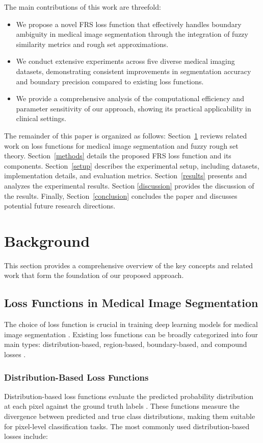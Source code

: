 \documentclass[review]{elsarticle}
\begin{document}
The main contributions of this work are threefold:
\begin{itemize}
    \item We propose a novel FRS loss function that effectively handles boundary ambiguity in medical image segmentation through the integration of fuzzy similarity metrics and rough set approximations.
    \item We conduct extensive experiments across five diverse medical imaging datasets, demonstrating consistent improvements in segmentation accuracy and boundary precision compared to existing loss functions.
    \item We provide a comprehensive analysis of the computational efficiency and parameter sensitivity of our approach, showing its practical applicability in clinical settings.
\end{itemize}

The remainder of this paper is organized as follows: Section~\ref{background} reviews related work on loss functions for medical image segmentation and fuzzy rough set theory. Section~\ref{methods} details the proposed FRS loss function and its components. Section~\ref{setup} describes the experimental setup, including datasets, implementation details, and evaluation metrics. Section~\ref{results} presents and analyzes the experimental results. Section \ref{discussion} provides the discussion of the results. Finally, Section~\ref{conclusion} concludes the paper and discusses potential future research directions.

\section{Background}\label{background}
This section provides a comprehensive overview of the key concepts and related work that form the foundation of our proposed approach.

\subsection{Loss Functions in Medical Image Segmentation}
The choice of loss function is crucial in training deep learning models for medical image segmentation \cite{taghanaki2021deep}. Existing loss functions can be broadly categorized into four main types: distribution-based, region-based, boundary-based, and compound losses \cite{Ma2021}.

\subsubsection{Distribution-Based Loss Functions}
Distribution-based loss functions evaluate the predicted probability distribution at each pixel against the ground truth labels \cite{Ronneberger2015}. These functions measure the divergence between predicted and true class distributions, making them suitable for pixel-level classification tasks. The most commonly used distribution-based losses include:
\end{document}
